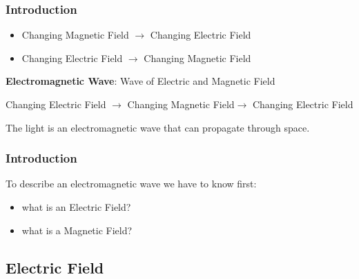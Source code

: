\documentclass[]{beamer}
\begin{document}
\begin{frame}
\frametitle{Introduction}


\begin{itemize}
 \item  Changing Magnetic Field $\rightarrow$ Changing Electric Field
\pause 

\item Changing Electric Field $\rightarrow$ Changing Magnetic Field
\end{itemize}

\vspace{3mm}


\textbf{Electromagnetic Wave}: Wave of Electric and Magnetic Field
\pause
\vspace{3mm}

Changing Electric Field $\rightarrow$ Changing Magnetic Field$\rightarrow$ Changing Electric Field 

\pause
\vspace{3mm}

The light is an electromagnetic wave that can propagate through space.

  \end{frame}



\begin{frame}
\frametitle{Introduction}

To describe an electromagnetic wave we have to know first:
\pause

\begin{itemize}
 \item what is an Electric Field? 
\pause 

\item what is a Magnetic Field? 
\end{itemize}


  \end{frame}
\subsection{Electric Field}
\end{document}

